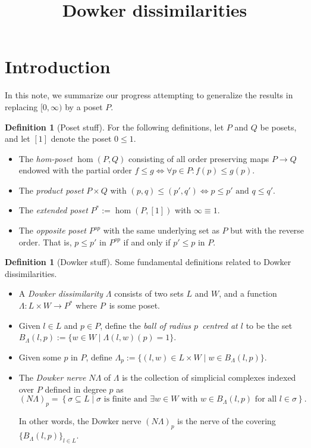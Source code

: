 \documentclass[10pt,a4paper]{article}
\title{Dowker dissimilarities}
\theoremstyle{definition}
\newtheorem{defn}[thm]{Definition}
\begin{document}
	\maketitle

\section{Introduction}

In this note, we summarize our progress attempting to generalize the results in \autocite{blaser2019sparse} replacing $[0,\infty)$ by a poset $P$.

\begin{defn}[Poset stuff]
	For the following definitions, let $P$ and $Q$ be posets, and let $[1]$ denote the poset $0\leq 1$.
	\begin{itemize}
		\item The \textit{hom-poset} $\hom(P,Q)$ consisting of all order preserving maps $P\to Q$ endowed with the partial order $f\leq g \iff \forall p\in P : f(p)\leq g(p)$.
		
		\item The \textit{product poset} $P\times Q$ with $(p,q)\leq(p',q')\iff p\leq p'\text{ and }q\leq q'$.
		
		\item The \textit{extended poset} $P^*:=\hom(P,[1])$ with $\infty \equiv 1$.
		
		\item The \textit{opposite poset} $P^{op}$ with the same underlying set as $P$ but with the reverse order. That is, $p\leq p'$ in $P^{op}$ if and only if $p'\leq p$ in $P$.
	\end{itemize}
\end{defn} 

\begin{defn}[Dowker stuff]
	Some fundamental definitions related to Dowker dissimilarities.
\begin{itemize}
\item A \textit{Dowker dissimilarity} $\Lambda$ consists of two sets $L$ and $W$, and a function $\Lambda\colon L\times W\to P^*$ where $P$ is some poset.

\item Given $l\in L$ and $p\in P$, define the \textit{ball of radius $p$ centred at $l$} to be the set $B_\Lambda(l,p):=\{w\in W\mid\Lambda(l,w)(p)=1\}$. 

\item Given some $p$ in $P$, define $\Lambda_p:=\{(l,w)\in L\times W\mid w\in B_\Lambda(l,p)\}$.

\item The \textit{Dowker nerve} $N\Lambda$ of $\Lambda$ is the collection of simplicial complexes indexed over $P$ defined in degree $p$ as 
$$
(N\Lambda)_{p} = \left\{\sigma\subseteq L\mid\sigma\text{ is finite and } \exists w\in W \text{ with } w\in B_\Lambda(l,p)\text{ for all }l\in\sigma \right\}.
$$

In other words, the Dowker nerve $(N\Lambda)_p$ is the nerve of the covering $\{B_\Lambda(l,p)\}_{l\in L}$.
\end{itemize}
\end{defn} 
\end{document}

